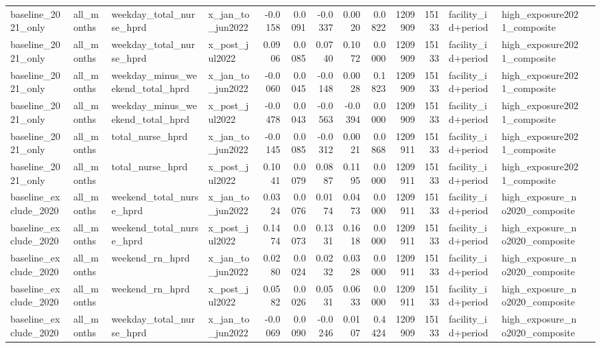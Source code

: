 \begin{tabular}{llllrrrrrrrlll}
baseline_2021_only & all_months & weekday_total_nurse_hprd & x_jan_to_jun2022 & -0.0158 & 0.0091 & -0.0337 & 0.0020 & 0.0822 & 1209909 & 15133 & facility_id+period & high_exposure2021_composite &  \\
baseline_2021_only & all_months & weekday_total_nurse_hprd & x_post_jul2022 & 0.0906 & 0.0085 & 0.0740 & 0.1072 & 0.0000 & 1209909 & 15133 & facility_id+period & high_exposure2021_composite &  \\
baseline_2021_only & all_months & weekday_minus_weekend_total_hprd & x_jan_to_jun2022 & -0.0060 & 0.0045 & -0.0148 & 0.0028 & 0.1823 & 1209909 & 15133 & facility_id+period & high_exposure2021_composite &  \\
baseline_2021_only & all_months & weekday_minus_weekend_total_hprd & x_post_jul2022 & -0.0478 & 0.0043 & -0.0563 & -0.0394 & 0.0000 & 1209909 & 15133 & facility_id+period & high_exposure2021_composite &  \\
baseline_2021_only & all_months & total_nurse_hprd & x_jan_to_jun2022 & -0.0145 & 0.0085 & -0.0312 & 0.0021 & 0.0868 & 1209911 & 15133 & facility_id+period & high_exposure2021_composite &  \\
baseline_2021_only & all_months & total_nurse_hprd & x_post_jul2022 & 0.1041 & 0.0079 & 0.0887 & 0.1195 & 0.0000 & 1209911 & 15133 & facility_id+period & high_exposure2021_composite &  \\
baseline_exclude_2020 & all_months & weekend_total_nurse_hprd & x_jan_to_jun2022 & 0.0324 & 0.0076 & 0.0174 & 0.0473 & 0.0000 & 1209911 & 15133 & facility_id+period & high_exposure_no2020_composite &  \\
baseline_exclude_2020 & all_months & weekend_total_nurse_hprd & x_post_jul2022 & 0.1474 & 0.0073 & 0.1331 & 0.1618 & 0.0000 & 1209911 & 15133 & facility_id+period & high_exposure_no2020_composite &  \\
baseline_exclude_2020 & all_months & weekend_rn_hprd & x_jan_to_jun2022 & 0.0280 & 0.0024 & 0.0232 & 0.0328 & 0.0000 & 1209911 & 15133 & facility_id+period & high_exposure_no2020_composite &  \\
baseline_exclude_2020 & all_months & weekend_rn_hprd & x_post_jul2022 & 0.0582 & 0.0026 & 0.0531 & 0.0633 & 0.0000 & 1209911 & 15133 & facility_id+period & high_exposure_no2020_composite &  \\
baseline_exclude_2020 & all_months & weekday_total_nurse_hprd & x_jan_to_jun2022 & -0.0069 & 0.0090 & -0.0246 & 0.0107 & 0.4424 & 1209909 & 15133 & facility_id+period & high_exposure_no2020_composite &  \\

\end{tabular}
